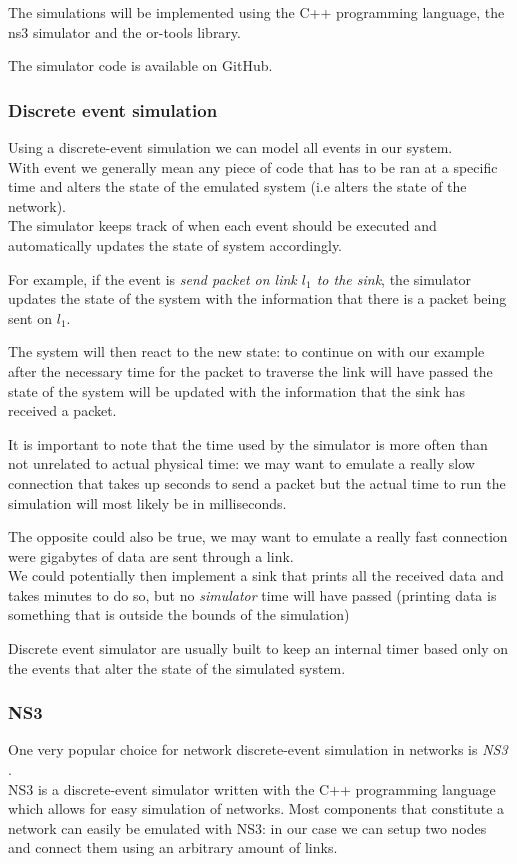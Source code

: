 The simulations will be implemented using the C++ programming language, the ns3 simulator and the or-tools library.

The simulator code is available on GitHub. \cite{thesis_source_code}

\subsubsection{Discrete event simulation}

Using a discrete-event simulation we can model all events in our system. \\
With event we generally mean any piece of code that has to be ran at a specific time and alters the state of the emulated system (i.e alters the state of the network). \\
The simulator keeps track of when each event should be executed and automatically updates the state of system accordingly.

For example, if the event is \textit{send packet on link $l_1$ to the sink}, the simulator updates the state of the system with the information that there is a packet being sent on $l_1$.

The system will then react to the new state: to continue on with our example after the necessary time for the packet to traverse the link will have passed the state of the system will be updated with the information that the sink has received a packet.

It is important to note that the time used by the simulator is more often than not unrelated to actual physical time: we may want to emulate a really slow connection that takes up seconds to send a packet but the actual time to run the simulation will most likely be in milliseconds.

The opposite could also be true, we may want to emulate a really fast connection were gigabytes of data are sent through a link. \\

We could potentially then implement a sink that prints all the received data and takes minutes to do so, but no \textit{simulator} time will have passed (printing data is something that is outside the bounds of the simulation)

Discrete event simulator are usually built to keep an internal timer based only on the events that alter the state of the simulated system.

\subsubsection{NS3}
One very popular choice for network discrete-event simulation in networks is \textit{NS3} \cite{ns3}. \\
NS3 is a discrete-event simulator written with the C++ programming language which allows for easy simulation of networks.
Most components that constitute a network can easily be emulated with NS3: in our case we can setup two nodes and connect them using an arbitrary amount of links. \\

